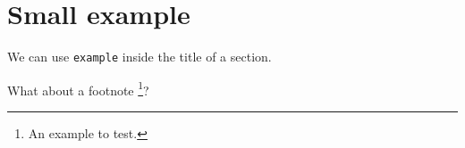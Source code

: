 \documentclass[12pt]{article}
\begin{document}
\section{Small example}

We can use \verb#example# inside the title of a section.

What about a footnote
\footnote{
	An example to test.
}? 
\end{document}
